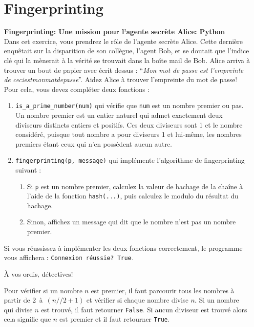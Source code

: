 \section{Fingerprinting}
\begin{Exercice}[15 minutes]\textbf{Fingerprinting: Une mission pour l'agente secrète Alice: Python}\\
    Dans cet exercice, vous prendrez le rôle de l'agente secrète Alice. Cette dernière enquêtait sur la disparition de son collègue,
    l'agent Bob, et se doutait que l'indice clé qui la mènerait à la vérité se trouvait dans la boîte mail de Bob. Alice arriva à trouver
    un bout de papier avec écrit dessus : ``\textit{Mon mot de passe est l'empreinte de ceciestmonmotdepasse}''. Aidez Alice à trouver l'empreinte du mot de passe! \\

    Pour cela, vous devez compléter deux fonctions :
    \begin{enumerate}
        \item \lstinline{is_a_prime_number(num)} qui vérifie que \lstinline{num} est un nombre premier ou pas. Un nombre premier est un entier naturel 
        qui admet exactement deux diviseurs distincts entiers et positifs. Ces deux diviseurs sont 1 et le nombre considéré, 
        puisque tout nombre a pour diviseurs 1 et lui-même, les nombres premiers étant ceux qui n’en possèdent aucun autre.
        
        \item \lstinline{fingerprinting(p, message)} qui implémente l'algorithme de fingerprinting suivant :
              \begin{enumerate}
                  \item Si \lstinline{p} est un nombre premier, calculez la valeur de hachage de la chaîne à l'aide de la fonction \lstinline{hash(...)}, puis calculez le modulo du résultat du hachage.
                  \item Sinon, affichez un message qui dit que le nombre n'est pas un nombre premier.    
              \end{enumerate}
    \end{enumerate}

    Si vous réussissez à implémenter les deux fonctions correctement, le programme vous affichera : \lstinline{Connexion réussie? True}.

    À vos ordis, détectives!

    
\begin{conseil}
Pour vérifier si un nombre $n$ est premier, il faut  parcourir tous les nombres à partir de $2$~à~$(n//2+1)$ et vérifier si chaque nombre divise $n$. Si un nombre qui divise $n$ est trouvé, il faut retourner \lstinline{False}. Si aucun diviseur est trouvé alors cela signifie que $n$ est premier et il faut retourner \lstinline{True}.
\end{conseil}

    \begin{solution}
        
    \end{solution}
\end{Exercice}

